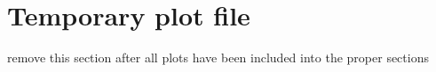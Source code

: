 \section{Temporary plot file}
remove this section after all plots have been included into the proper sections











